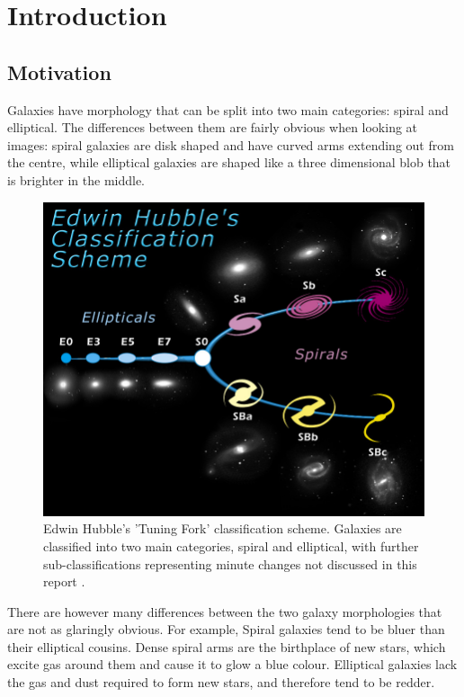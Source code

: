 \section{Introduction}
\label{sec:intro}
\subsection{Motivation}
Galaxies have morphology that can be split into two main categories: spiral and elliptical. 
The differences between them are fairly obvious when looking at images: spiral galaxies are disk shaped and have curved arms extending out from the centre, while elliptical galaxies are shaped like a three dimensional blob that is brighter in the middle. 

\begin{figure}[h]
	\centering
	\captionsetup{justification=centering,width=.8\linewidth}
	\includegraphics[scale=0.7]{Figures/TuningFork.jpg}
	\caption{Edwin Hubble's 'Tuning Fork' classification scheme. Galaxies are classified into two main categories, spiral and elliptical, with further sub-classifications representing minute changes not discussed in this report \cite{TuningFork}.}
	\label{fig:tuningfork}
\end{figure}


There are however many differences between the two galaxy morphologies that are not as glaringly obvious.  
For example, Spiral galaxies tend to be bluer than their elliptical cousins. 
Dense spiral arms are the birthplace of new stars, which excite gas around them and cause it to glow a blue colour. 
Elliptical galaxies lack the gas and dust required to form new stars, and therefore tend to be redder.\newpage

